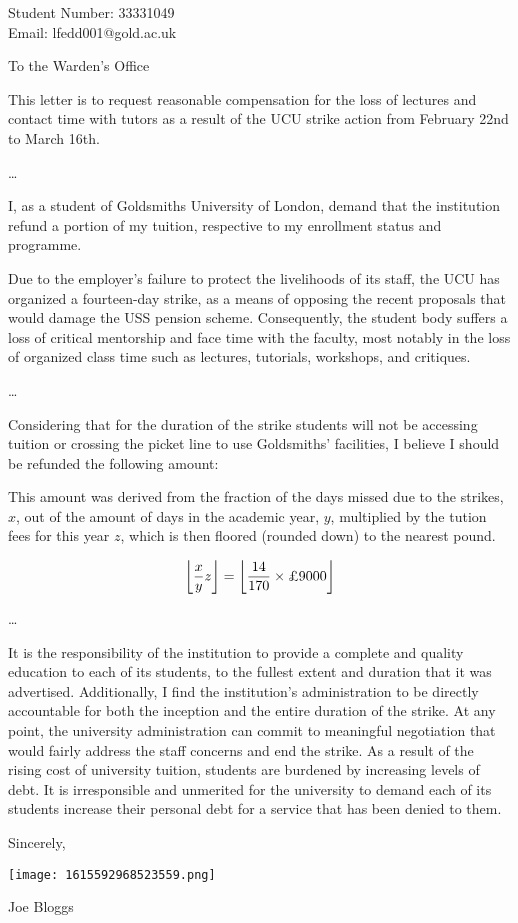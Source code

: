 \documentclass{letter}
\DeclarePairedDelimiter\floor{\lfloor}{\rfloor}
\begin{document}
\begin{letter}{Student Number: 33331049 \\ Email: lfedd001@gold.ac.uk}
\opening{To the Warden's Office}

This letter is to request reasonable compensation for the loss of lectures and contact time with tutors as a result of the UCU strike action from February 22nd to March 16th.

\ldots 

I, as a student of Goldsmiths University of London, demand that the institution refund a portion of my tuition, respective to my enrollment status and programme.

Due to the employer’s failure to protect the livelihoods of its staff, the UCU has organized a fourteen-day strike, as a means of opposing the recent proposals that would damage the USS pension scheme. Consequently, the student body suffers a loss of critical mentorship and face time with the faculty, most notably in the loss of organized class time such as lectures, tutorials, workshops, and critiques.

\ldots 

Considering that for the duration of the strike students will not be accessing tuition or crossing the picket line to use Goldsmiths’ facilities, I believe I should be refunded the following amount: \textbf{\underline{}} 

This amount was derived from the fraction of the days missed due to the strikes, $x$, out of the amount of days in the academic year, $y$, multiplied by the tution fees for this year $z$, which is then floored (rounded down) to the nearest pound.

\begin{equation}
\floor*{\frac{x}{y}z} = \floor*{\frac{14}{170} \times \text{\textsterling} 9000}
\end{equation}

\ldots 

It is the responsibility of the institution to provide a complete and quality education to each of its students, to the fullest extent and duration that it was advertised. Additionally, I find the institution’s administration to be directly accountable for both the inception and the entire duration of the strike. At any point, the university administration can commit to meaningful negotiation that would fairly address the staff concerns and end the strike. As a result of the rising cost of university tuition, students are burdened by increasing levels of debt. It is irresponsible and unmerited for the university to demand each of its students increase their personal debt for a service that has been denied to them.

\vspace{3em}

Sincerely,

\vspace{-3em}
\texttt{[image: 1615592968523559.png]}

Joe Bloggs

\end{letter}
\end{document}
